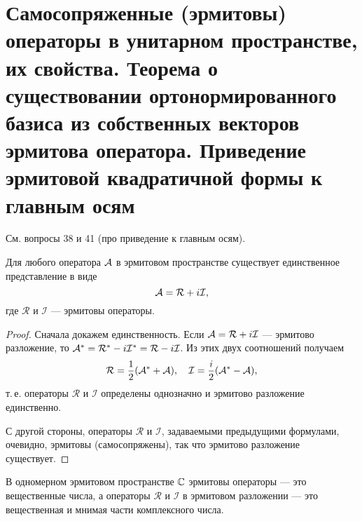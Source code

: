 \section{Самосопряженные (эрмитовы) операторы в унитарном пространстве, их свойства. Теорема о существовании ортонормированного базиса из собственных векторов эрмитова оператора. Приведение эрмитовой квадратичной формы к главным осям}

См. вопросы 38 и 41 (про приведение к главным осям).

\begin{theorem}
    Для любого оператора $\mathcal{A}$ в эрмитовом пространстве существует единственное представление в виде
    \[
        \mathcal{A} = \mathcal{R} + i\mathcal{I},
    \]
    где $\mathcal{R}$ и $\mathcal{I}$ --- эрмитовы операторы.
\end{theorem}

\begin{proof}
    Сначала докажем единственность. Если $\mathcal{A} = \mathcal{R} + i\mathcal{I}$ --- эрмитово разложение, то $\mathcal{A}^\ast = \mathcal{R}^\ast - i\mathcal{I}^\ast = \mathcal{R} - i\mathcal{I}$. Из этих двух соотношений получаем
    \[
        \mathcal{R} = \frac{1}{2}(\mathcal{A}^\ast + \mathcal{A}),\quad\mathcal{I} = \frac{i}{2}(\mathcal{A}^\ast - \mathcal{A}),
    \]
    т.\,е. операторы $\mathcal{R}$ и $\mathcal{I}$ определены однозначно и эрмитово разложение единственно.

    С другой стороны, операторы $\mathcal{R}$ и $\mathcal{I}$, задаваемыми предыдущими формулами, очевидно, эрмитовы (самосопряжены), так что эрмитово разложение существует.
\end{proof}

В одномерном эрмитовом пространстве $\mathbb{C}$ эрмитовы операторы --- это вещественные числа, а операторы $\mathcal{R}$ и $\mathcal{I}$ в эрмитовом разложении --- это вещественная и мнимая части комплексного числа.

